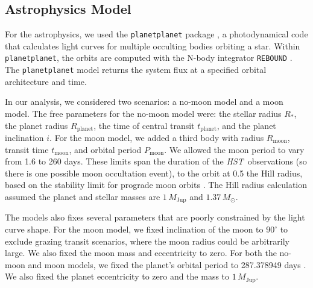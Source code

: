 \documentclass[twocolumn]{aastex62}
\newcommand{\project}[1]{\textsl{#1}}
\newcommand{\HST}{\project{HST}}
\begin{document}
\subsection{Astrophysics Model}
For the astrophysics, we used the \texttt{planetplanet} package \citep{luger17}, a photodynamical code that calculates light curves for multiple occulting bodies orbiting a star. Within \texttt{planetplanet}, the orbits are computed with the N-body integrator \texttt{REBOUND} \citep{rein12}. The \texttt{planetplanet} model returns the system flux at a specified orbital architecture and time. 

In our analysis, we considered two scenarios: a no-moon model and a moon model. The free parameters for the no-moon model were: the stellar radius $R_*$, the planet radius $R_\mathrm{planet}$, the time of central transit $t_\mathrm{planet}$, and the planet inclination $i$. For the moon model, we added a third body with radius $R_\mathrm{moon}$, transit time $t_\mathrm{moon}$, and orbital period $P_\mathrm{moon}$. We allowed the moon period to vary from 1.6 to 260 days. These limits span the duration of the \HST\ observations (so there is one possible moon occultation event), to the orbit at 0.5 the Hill radius, based on the stability limit for prograde moon orbits \citep{domingos06}. The Hill radius calculation assumed the planet and stellar masses are $1\,M_\mathrm{Jup}$ and $1.37\,M_\odot$.

The models also fixes several parameters that are poorly constrained by the light curve shape. For the moon model, we fixed inclination of the moon to $90^\circ$ to exclude grazing transit scenarios, where the moon radius could be arbitrarily large.  We also fixed the moon mass and eccentricity to zero.  For both the no-moon and moon models, we fixed the planet's orbital period to 287.378949 days \citep{teachey18b}. We also fixed the planet eccentricity to zero and the mass to $1\,M_\mathrm{Jup}$. 
\end{document}
